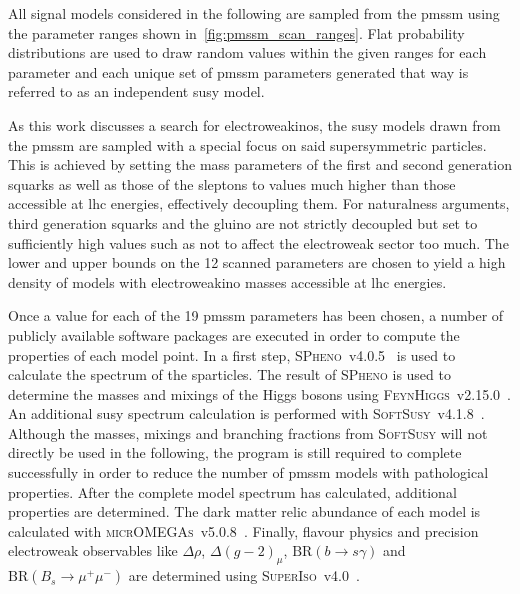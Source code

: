 All signal models considered in the following are sampled from the \gls{pmssm} using the parameter ranges shown in~\cref{fig:pmssm_scan_ranges}. Flat probability distributions are used to draw random values within the given ranges for each parameter and each unique set of \gls{pmssm} parameters generated that way is referred to as an independent \gls{susy} model. 

As this work discusses a search for electroweakinos, the \gls{susy} models drawn from the \gls{pmssm} are sampled with a special focus on said supersymmetric particles. This is achieved by setting the mass parameters of the first and second generation squarks as well as those of the sleptons to values much higher than those accessible at \gls{lhc} energies, effectively decoupling them. For naturalness arguments, third generation squarks and the gluino are not strictly decoupled but set to sufficiently high values such as not to affect the electroweak sector too much. The lower and upper bounds on the 12 scanned parameters are chosen to yield a high density of models with electroweakino masses accessible at \gls{lhc} energies. 

Once a value for each of the 19 \gls{pmssm} parameters has been chosen, a number of publicly available software packages are executed in order to compute the properties of each model point. In a first step, \textsc{SPheno}~v4.0.5~\cite{spheno_1:2003um,spheno_2:2011nf} is used to calculate the spectrum of the sparticles. The result of \textsc{SPheno} is used to determine the masses and mixings of the Higgs bosons using \textsc{FeynHiggs}~v2.15.0~\cite{FeynHiggs:1998yj,FeynHiggs_1:2018qog,FeynHiggs_2:2013ria}. An additional \gls{susy} spectrum calculation is performed with \textsc{SoftSusy}~v4.1.8~\cite{softsusy:2001kg}. Although the masses, mixings and branching fractions from \textsc{SoftSusy} will not directly be used in the following, the program is still required to complete successfully in order to reduce the number of \gls{pmssm} models with pathological properties. After the complete model spectrum has calculated, additional properties are determined. The dark matter relic abundance of each model is calculated with \textsc{micrOMEGAs}~v5.0.8~\cite{micromegas_1:2006is,micromegas_2:2010pz}. Finally, flavour physics and precision electroweak observables like $\Delta\rho$, $\Delta(g-2)_\mu$, $\mathrm{BR}(b\rightarrow s\gamma)$ and $\mathrm{BR}(B_s\rightarrow \mu^+\mu^-)$ are determined using  \textsc{SuperIso}~v4.0~\cite{superiso:2008tp}.


